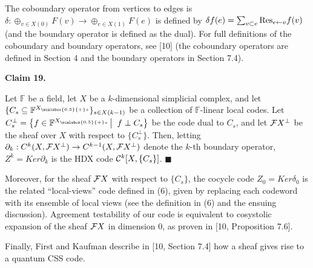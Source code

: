 


The coboundary operator from vertices to edges is $\delta:\oplus_{v\in X(0)}F(v)\to\oplus_{e\in X(1)}F(e)$ is defined by
$\delta f(e)=\sum_{v\subset e}{\rm Res}_{{e}\leftarrow{v}}f(v)$ (and the boundary operator is defined as the dual).
For full definitions of the coboundary and boundary operators, see [10] (the coboundary operators are defined in Section 4 and the boundary operators in Section 7.4).\par





\par\medskip\noindent\textbf{
Claim 19. 
}\par



Let $\mathbb{F}$ be a field, let $X$ be a $k$-dimensional simplicial complex, and let $\{C_{s}\subseteq\mathbb{F}^{{X}_{\scalebox{0.5}{+}s}}\}_{s\in X(k-1)}$ be a collection of $\mathbb{F}$-linear local codes. Let $C_{s}^{\perp}=\left\{f\in\mathbb{F}^{{X}_{\scalebox{0.5}{+}s}}\left|\;\vphantom{f\in\mathbb{F}^{{X}_{\scalebox{0.5}{+}s}}f\perp C_{s}}\right.f\perp C_{s}\right\}$ be the code dual to $C_{s}$, and let ${\cal F}X^{\perp}$ be the sheaf over $X$ with respect to $\{C_{s}^{\perp}\}$.
Then, letting $\partial_{k}:C^{k}(X,{\cal F}X^{\perp})\to C^{k-1}(X,{\cal F}X^{\perp})$ denote the $k$-th boundary operator, $Z^{k}=Ker\partial_{k}$ is the HDX code ${\cal C}^{k}[X,\{C_{s}\}]$. \ensuremath{\blacksquare}\par






Moreover, for the sheaf ${\cal F}X$ with respect to $\{C_{s}\}$, the cocycle code $Z_{0}=Ker\delta_{0}$ is the related “local-views” code defined in (6), given by replacing each codeword with its ensemble of local views (see the definition in (6) and the ensuing discussion).
Agreement testability of our code is equivalent to cosystolic expansion of the sheaf ${\cal F}X$ in dimension $0$, as proven in [10, Proposition 7.6].\par




Finally, First and Kaufman describe in [10, Section 7.4] how a sheaf gives rise to a quantum CSS code.\par






